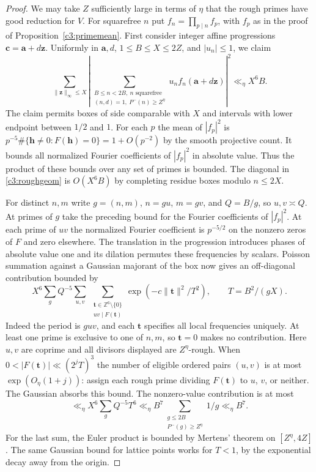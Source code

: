 \documentclass[11pt,letterpaper]{article}
\theoremstyle{definition}
\begin{document}
\begin{proof}
We may take $Z$ sufficiently large in terms of $\eta$ that the
rough primes have good reduction for $V$. For squarefree $n$ put
$f_n=\prod_{p\mid n} f_p$, with $f_p$ as in the proof of
Proposition~\ref{c3:primemean}. First consider integer affine
progressions $\mathbf c=\mathbf a+d\mathbf z$. Uniformly in
$\mathbf a,d$, $1\le B\le X\le 2Z$, and $|u_n|\le1$, we claim
\begin{equation}\label{c3:roughgeom}
 \sum_{\|\mathbf z\|_\infty\le X}
  \left|\sum_{\substack{B\le n<2B,\ n\text{ squarefree}\\
                 (n,d)=1,\ P^-(n)\ge Z^\eta}}
        u_n f_n(\mathbf a+d\mathbf z)\right|^2
             \ll_\eta X^6 B.
\end{equation}
The claim permits boxes of side comparable with $X$ and intervals
with lower endpoint between $1/2$ and $1$. For each $p$ the mean
of $|f_p|^2$ is $p^{-5}\#\{\mathbf h\ne0:F(\mathbf h)=0\}
=1+O(p^{-2})$ by the smooth projective count. It bounds all
normalized Fourier coefficients of $|f_p|^2$ in absolute value.
Thus the product of these bounds over any set of primes is bounded.
The diagonal in \eqref{c3:roughgeom} is $O(X^6B)$ by completing
residue boxes modulo $n\le2X$.

For distinct $n,m$ write $g=(n,m)$, $n=gu$, $m=gv$, and
$Q=B/g$, so $u,v\asymp Q$. At primes of $g$ take the preceding
bound for the Fourier coefficients of $|f_p|^2$. At each prime
of $uv$ the normalized Fourier coefficient is $p^{-5/2}$ on the
nonzero zeros of $F$ and zero elsewhere. The translation in the
progression introduces phases of absolute value one and its
dilation permutes these frequencies by scalars. Poisson summation
against a Gaussian majorant of the box now gives an off-diagonal
contribution bounded by
\[
 X^6\sum_{g} Q^{-5}
   \sum_{u,v}\ \sum_{\substack{\mathbf t\in\mathbb Z^6\setminus\{0\}\\
                                  uv\mid F(\mathbf t)}}
             \exp(-c\|\mathbf t\|^2/T^2),
 \qquad T=B^2/(gX).
\]
Indeed the period is $guv$, and each $\mathbf t$ specifies all
local frequencies uniquely. At least one prime is exclusive to
one of $n,m$, so $\mathbf t=0$ makes no contribution. Here $u,v$
are coprime and all divisors displayed are $Z^\eta$-rough. When
$0<|F(\mathbf t)|\ll (2^jT)^3$ the number of eligible ordered pairs
$(u,v)$ is at most $\exp(O_\eta(1+j))$: assign each rough prime
dividing $F(\mathbf t)$ to $u$, $v$, or neither. The Gaussian absorbs
this bound. The nonzero-value contribution is at most
\[
  \ll_\eta X^6\sum_{g}Q^{-5}T^6
  \ll_\eta B^7\sum_{\substack{g\le2B\\P^-(g)\ge Z^\eta}}1/g
  \ll_\eta B^7 .
\]
For the last sum, the Euler product is bounded by Mertens' theorem
on $[Z^\eta,4Z]$. The same Gaussian bound for lattice points works
for $T<1$, by the exponential decay away from the origin.


\end{proof}
\end{document}

